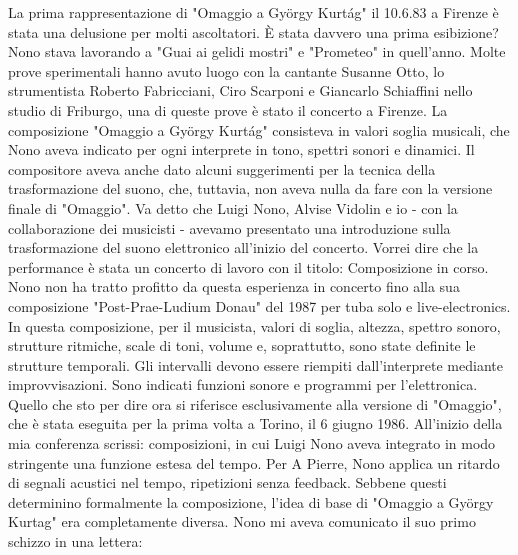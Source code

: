 La prima rappresentazione di "Omaggio a György Kurtág" il 10.6.83 a Firenze è stata una delusione per molti ascoltatori. È stata davvero una prima esibizione?
Nono stava lavorando a "Guai ai gelidi mostri" e "Prometeo" in quell'anno. Molte prove sperimentali hanno avuto luogo con la cantante Susanne Otto, lo strumentista Roberto Fabricciani, Ciro Scarponi e Giancarlo Schiaffini nello studio di Friburgo, una di queste prove è stato il concerto a Firenze. La composizione "Omaggio a György Kurtág" consisteva in valori soglia musicali, che Nono aveva indicato per ogni interprete in tono, spettri sonori e dinamici. Il compositore aveva anche dato alcuni suggerimenti per la tecnica della trasformazione del suono, che, tuttavia, non aveva nulla da fare con la versione finale di "Omaggio". Va detto che Luigi Nono, Alvise Vidolin e io - con la collaborazione dei musicisti - avevamo presentato una introduzione sulla trasformazione del suono elettronico all'inizio del concerto. Vorrei dire che la performance è stata un concerto di lavoro con il titolo: Composizione in corso. Nono non ha tratto profitto da questa esperienza in concerto fino alla sua composizione "Post-Prae-Ludium Donau" del 1987 per tuba solo e live-electronics. In questa composizione, per il musicista, valori di soglia, altezza, spettro sonoro, strutture ritmiche, scale di toni, volume e, soprattutto, sono state definite le strutture temporali. Gli intervalli devono essere riempiti dall'interprete mediante improvvisazioni. Sono indicati funzioni sonore e programmi per l'elettronica.
Quello che sto per dire ora si riferisce esclusivamente alla versione di "Omaggio", che è stata eseguita per la prima volta a Torino, il 6 giugno 1986.
All'inizio della mia conferenza scrissi: composizioni, in cui Luigi Nono aveva integrato in modo stringente una funzione estesa del tempo. Per A Pierre, Nono applica un ritardo di segnali acustici nel tempo, ripetizioni senza feedback. Sebbene questi determinino formalmente la composizione, l'idea di base di "Omaggio a György Kurtag" era completamente diversa.
Nono mi aveva comunicato il suo primo schizzo in una lettera:

